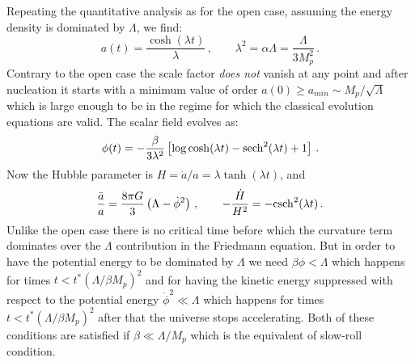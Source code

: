 \documentclass[a4paper,11pt]{article}
\numberwithin{equation}{section}
\begin{document}
\begin{itemize}
Repeating the quantitative analysis as for the open case, assuming the energy density is dominated by $\Lambda$, we find:
\begin{equation}
a(t)=\frac{\cosh (\lambda t)}{\lambda} \,, \qquad \lambda^2=\alpha\Lambda=\frac{\Lambda}{3M_p^2} \,.
\end{equation}
Contrary to the open case the scale factor {\it does not} vanish at any point and after nucleation it starts with a minimum value of order $a(0)\geq a_{min}\sim M_p/\sqrt{\Lambda} $ which is large enough to be in the  regime for which the classical evolution equations are valid. The scalar field evolves as:
\begin{equation}
\phi(t)=-\frac{\beta}{3\lambda^2}\left[\log\cosh(\lambda t)-{\rm sech}^2(\lambda t)+1\right] \,.
\end{equation}
Now the Hubble parameter is $H=\dot a/a=\lambda \tanh(\lambda t)$, and
\begin{equation}
\frac{\ddot a}{a}=\frac{8\pi G}{3}\left(\Lambda-\dot\phi^2\right) \,, \qquad  -\frac{\dot H}{H^2}=-{\rm csch}^2(\lambda t) \,.
\end{equation}
Unlike the open case there is no critical time  before which the curvature term dominates over the $\Lambda$ contribution in the Friedmann equation. But in order to have the potential energy to be dominated by $\Lambda$ we need $\beta\phi<\Lambda$ which happens for times $t<t^*\left(\Lambda/\beta M_p\right)^2$ and for having the kinetic energy suppressed with respect to the potential energy $\dot\phi^2\ll \Lambda$ which happens for times $t<t^*\left(\Lambda/\beta M_p\right)^2$ after that the universe stops accelerating. Both of these conditions are satisfied if $\beta\ll\Lambda/M_p$ which is the equivalent of slow-roll condition.


\end{itemize}
\end{document}

